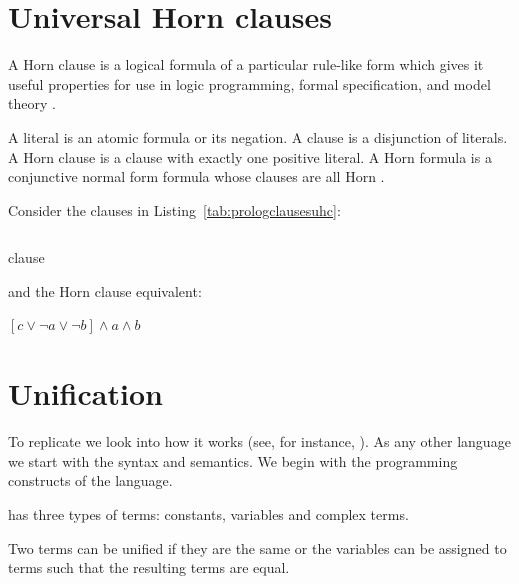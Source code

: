 \documentclass[thesis-solanki.tex]{subfiles}
\begin{document}
\section{Universal Horn clauses}
A Horn clause is a logical formula of a particular rule-like form which gives it useful properties for use in logic programming, formal 
specification, and model theory \cite{bjorner2013solving}. 

A literal is an atomic formula or its negation. A clause is a disjunction of literals. A Horn clause is a clause with exactly
one positive literal. A Horn formula is a conjunctive normal form formula whose clauses are all Horn \cite{website:hornclauseprolog}.

Consider the clauses in Listing~\ref{tab:prologclausesuhc}:
\begin{code-list}[H]
\begin{singlespace}
\inputminted{prolog}{prolog-pwp-universal-horn-clause.pl}
\end{singlespace}
\caption{ clause}
\label{tab:prologclausesuhc}
\end{code-list}

and the Horn clause equivalent: 

$[c \vee \neg a \vee \neg b] \wedge a \wedge b$

\section{Unification}

To replicate  we look into how it works (see, for instance, \cite{webiste:learnprolognow}).
%
As any other language we start with the syntax and semantics.
We begin with the programming constructs of the language.

 has three types of terms: constants, variables and complex terms.

Two terms can be unified if they are the same or the variables can be assigned to terms such that the resulting
terms are equal.
\end{document}
